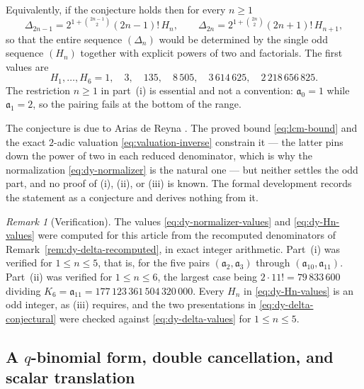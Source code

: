 \documentclass[11pt,oneside]{article}
\theoremstyle{definition}
\theoremstyle{remark}
\newtheorem{remark}[theorem]{Remark}
\begin{document}
Equivalently, if the conjecture holds then for every $n\ge1$
\begin{equation}
 \Delta_{2n-1}=2^{1+\binom{2n-1}{2}}(2n-1)!\,H_n,
 \qquad
 \Delta_{2n}=2^{1+\binom{2n}{2}}(2n+1)!\,H_{n+1},
                                                               \label{eq:dy-delta-conjectural}
\end{equation}
so that the entire sequence $(\Delta_n)$ would be determined by the single odd sequence
$(H_n)$ together with explicit powers of two and factorials.  The first values are
\begin{equation}
 H_1,\ldots,H_6=1,\quad3,\quad135,\quad8\,505,\quad3\,614\,625,\quad2\,218\,656\,825.
                                                               \label{eq:dy-Hn-values}
\end{equation}
The restriction $n\ge1$ in part~(i) is essential and not a convention: $\mathfrak a_0=1$
while $\mathfrak a_1=2$, so the pairing fails at the bottom of the range.

The conjecture is due to Arias de Reyna \cite{arias2018}.  The proved bound
\eqref{eq:lcm-bound} and the exact $2$-adic valuation \eqref{eq:valuation-inverse} constrain
it --- the latter pins down the power of two in each reduced denominator, which is why the
normalization \eqref{eq:dy-normalizer} is the natural one --- but neither settles the odd
part, and no proof of (i), (ii), or (iii) is known.  The formal development records the
statement as a conjecture and derives nothing from it.

\begin{remark}[Verification]
\label{rem:dy-conjecture-check}
The values \eqref{eq:dy-normalizer-values} and \eqref{eq:dy-Hn-values} were computed for
this article from the recomputed denominators of
Remark~\ref{rem:dy-delta-recomputed}, in exact integer arithmetic.  Part~(i) was verified for
$1\le n\le5$, that is, for the five pairs $(\mathfrak a_2,\mathfrak a_3)$ through
$(\mathfrak a_{10},\mathfrak a_{11})$.  Part~(ii) was verified for $1\le n\le6$, the largest
case being $2\cdot11!=79\,833\,600$ dividing
$K_6=\mathfrak a_{11}=177\,123\,361\,504\,320\,000$.  Every $H_n$ in
\eqref{eq:dy-Hn-values} is an odd integer, as (iii) requires, and the two presentations in
\eqref{eq:dy-delta-conjectural} were checked against \eqref{eq:dy-delta-values} for
$1\le n\le5$.
\end{remark}

\subsection{A $q$-binomial form, double cancellation, and scalar translation}
\label{subsec:q-binomial-dyadic}
\end{document}
